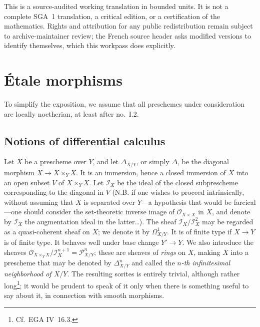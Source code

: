 \documentclass[11pt,oneside]{amsbook}
\begin{document}
This is a source-audited working translation in bounded units.  It is not
a complete SGA~1 translation, a critical edition, or a certification of the
mathematics.  Rights and attribution for any public redistribution remain
subject to archive-maintainer review; the French source header asks modified
versions to identify themselves, which this workpass does explicitly.

\tableofcontents

\mainmatter
\setcounter{chapter}{0}
\chapter{Étale morphisms}
\label{I}

To simplify the exposition, we assume that all preschemes under
consideration are locally noetherian, at least after no.~I.2.

\section{Notions of differential calculus}
\label{I.1}

Let \(X\) be a prescheme over \(Y\), and let \(\Delta_{X/Y}\), or simply
\(\Delta\),\label{indnot:ab} be the diagonal morphism
\(X\to X\times_Y X\).  It is an
immersion, hence a closed immersion of \(X\) into an open subset \(V\) of
\(X\times_Y X\).  Let \(\mathcal I_X\) be the ideal of the closed
subprescheme corresponding to the diagonal in \(V\) (N.B. if one wishes to
proceed intrinsically, without assuming that \(X\) is separated over
\(Y\)---a hypothesis that would be farcical---one should consider the
set-theoretic inverse image of \(\mathcal O_{X\times X}\) in \(X\), and
denote by \(\mathcal I_X\) the augmentation ideal in the latter\ldots).
The sheaf \(\mathcal I_X/\mathcal I_X^2\) may be regarded as a
quasi-coherent sheaf on \(X\); we denote it by \(\Omega^1_{X/Y}\).  It is
\label{indnot:ac}
of finite type if \(X\to Y\) is of finite type.  It behaves well under base
change \(Y'\to Y\).  We also introduce the sheaves
\(\mathcal O_{X\times_Y X}/\mathcal I_X^{n+1}=\mathcal P^n_{X/Y}\);\label{indnot:ad} these
are sheaves of \emph{rings} on \(X\), making \(X\) into a prescheme that
may be denoted by \(\Delta^n_{X/Y}\)\label{indnot:ae} and called the \emph{\(n\)-th
infinitesimal neighborhood of \(X/Y\)}.  The resulting sorites is entirely
trivial, although rather long\footnote{Cf.\ EGA IV~16.3.}; it would be
prudent to speak of it only when there is something useful to say about it,
in connection with smooth morphisms.
\end{document}
